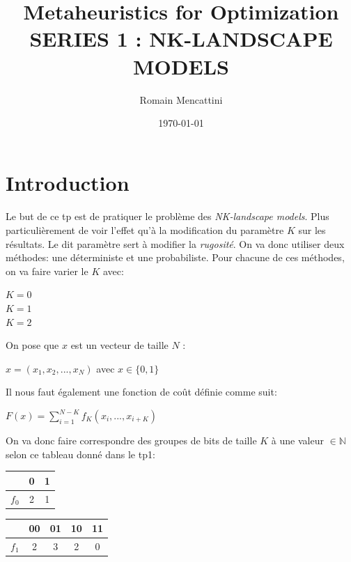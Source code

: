 \documentclass[a4paper, 11pt]{article}
\title{Metaheuristics for Optimization\\SERIES 1 : NK-LANDSCAPE MODELS}
\author{Romain Mencattini}
\date{\today}
\begin{document}
\maketitle
\newpage
\tableofcontents
\newpage

\section{Introduction}
\paragraph{}
Le but de ce tp est de pratiquer le problème des \textit{NK-landscape models}. Plus particulièrement de voir l'effet qu'à la modification
du paramètre $K$ sur les résultats. Le dit paramètre sert à modifier la \textit{rugosité}. On va donc utiliser deux méthodes: une
déterministe et une probabiliste. Pour chacune de ces méthodes, on va faire varier le $K$ avec:
\begin{center} $K = 0$\\ $K = 1$ \\ $K = 2$ \end{center}

On pose que $x$ est un vecteur de taille $N$ :\\
\begin{center} $x = (x_1,x_2,... ,x_N)$ avec $x \in \{0,1\}$ \end{center}

Il nous faut également une fonction de coût définie comme suit:
\begin{center} $F(x) = \sum\limits_{i=1}^{N-K} f_K (x_i,...,x_{i+K})$\end{center}

On va donc faire correspondre des groupes de bits de taille $K$ à une valeur $\in \mathbb{N}$ selon ce tableau donné dans le tp1:
\begin{center}

\begin{tabular}{c | c | c}
\  & 0 & 1 \\
\hline
$f_0$ & 2 & 1
\end{tabular}
\end{center}

\begin{center}
\begin{tabular}{c | c | c | c | c }
 \  & 00 & 01 & 10 & 11\\
 \hline
 $f_1$ & 2 & 3 & 2 & 0
\end{tabular}
\end{center}
\end{document}
